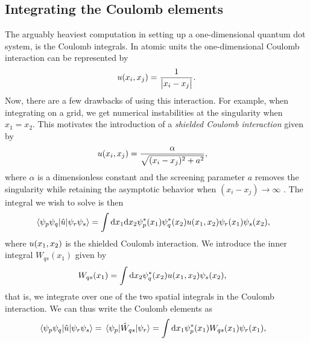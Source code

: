     \subsection{Integrating the Coulomb elements}
        The arguably heaviest computation in setting up a one-dimensional
        quantum dot system, is the Coulomb integrals.
        In atomic units the one-dimensional Coulomb interaction can be
        represented by
        \begin{align}
            u(x_i, x_j) = \frac{1}{\abs{x_i - x_j}}.
        \end{align}
        Now, there are a few drawbacks of using this interaction.
        For example, when integrating on a grid, we get numerical instabilities
        at the singularity when $x_1 = x_2$.
        This motivates the introduction of a \emph{shielded Coulomb interaction}
        \cite{suq} given by
        \begin{align}
            u(x_i, x_j)
            &= \frac{\alpha}{\sqrt{(x_i - x_j)^2 + a^2}},
            \label{eq:shielded-coulomb}
        \end{align}
        where $\alpha$ is a dimensionless constant and the screening parameter
        $a$ removes the singularity while retaining the asymptotic behavior when
        $(x_i - x_j) \to \infty$ \cite{suq}.
        The integral we wish to solve is then
        \begin{align}
            \mel*{\psi_{p}\psi_{q}}{\hat{u}}{\psi_{r}\psi_{s}}
            &=
            \int\dd x_1 \dd x_2
            \psi^{*}_{p}(x_1)\psi^{*}_{q}(x_2)
            u(x_1, x_2)
            \psi_{r}(x_1)
            \psi_{s}(x_2),
        \end{align}
        where $u(x_1, x_2)$ is the shielded Coulomb interaction.
        We introduce the inner integral $W_{qs}(x_1)$ given by
        \begin{align}
            W_{qs}(x_1)
            &= \int\dd x_2
            \psi^{*}_{q}(x_2) u(x_1, x_2)
            \psi_{s}(x_2),
        \end{align}
        that is, we integrate over one of the two spatial integrals in the
        Coulomb interaction.
        We can thus write the Coulomb elements as
        \begin{align}
            \mel*{\psi_{p}\psi_{q}}{\hat{u}}{\psi_{r}\psi_{s}}
            &=
            \mel*{\psi_{p}}{\hat{W}_{qs}}{\psi_{r}}
            =
            \int\dd x_1
            \psi^{*}_{p}(x_1)
            W_{qs}(x_1)
            \psi_{r}(x_1),
        \end{align}
